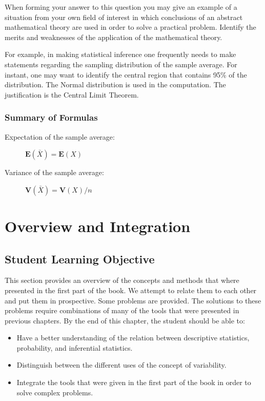 \documentclass[]{krantz}
\newcommand{\Expec}{\mathbf{E}}
\newcommand{\Var}{\mathbf{V}}
\theoremstyle{definition}
\theoremstyle{definition}
\theoremstyle{definition}
\theoremstyle{remark}
\begin{document}
When forming your answer to this question you may give an example of a
situation from your own field of interest in which conclusions of an
abstract mathematical theory are used in order to solve a practical
problem. Identify the merits and weaknesses of the application of the
mathematical theory.

For example, in making statistical inference one frequently needs to
make statements regarding the sampling distribution of the sample
average. For instant, one may want to identify the central region that
contains 95\% of the distribution. The Normal distribution is used in the
computation. The justification is the Central Limit Theorem.

\hypertarget{summary-of-formulas}{%
\subsection*{Summary of Formulas}\label{summary-of-formulas}}


\begin{description}
\item[Expectation of the sample average:]
\(\Expec(\bar X) = \Expec(X)\)
\item[Variance of the sample average:]
\(\Var(\bar X) = \Var(X)/n\)
\end{description}

\hypertarget{overview-and-integration}{%
\chapter{Overview and Integration}\label{overview-and-integration}}

\hypertarget{student-learning-objective-4}{%
\section{Student Learning Objective}\label{student-learning-objective-4}}

This section provides an overview of the concepts and methods that where
presented in the first part of the book. We attempt to relate them to
each other and put them in prospective. Some problems are provided. The
solutions to these problems require combinations of many of the tools
that were presented in previous chapters. By the end of this chapter,
the student should be able to:

\begin{itemize}
\item
  Have a better understanding of the relation between descriptive
  statistics, probability, and inferential statistics.
\item
  Distinguish between the different uses of the concept of
  variability.
\item
  Integrate the tools that were given in the first part of the book in
  order to solve complex problems.
\end{itemize}
\end{document}
